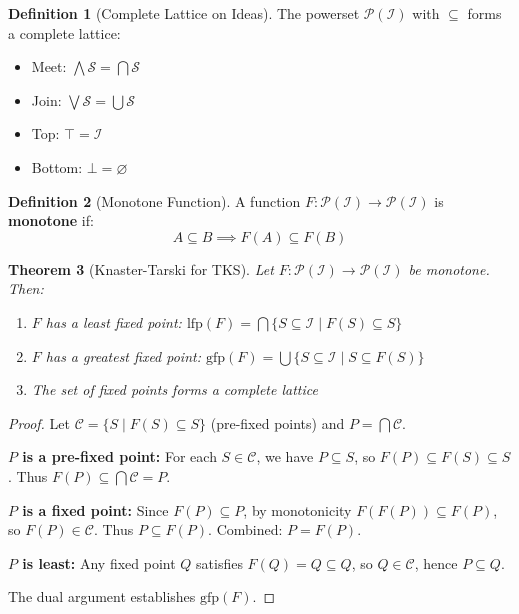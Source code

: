 \documentclass[11pt,twoside,openright]{book}
\theoremstyle{definition}
\newtheorem{definition}{Definition}[chapter]
\theoremstyle{plain}
\newtheorem{theorem}[definition]{Theorem}
\theoremstyle{remark}
\newcommand{\Ideas}{\mathcal{I}}
\begin{document}
\begin{definition}[Complete Lattice on Ideas]
\label{def:complete-lattice}
The powerset $\mathcal{P}(\Ideas)$ with $\subseteq$ forms a complete lattice:
\begin{itemize}
  \item Meet: $\bigwedge \mathcal{S} = \bigcap \mathcal{S}$
  \item Join: $\bigvee \mathcal{S} = \bigcup \mathcal{S}$
  \item Top: $\top = \Ideas$
  \item Bottom: $\bot = \varnothing$
\end{itemize}
\end{definition}

\begin{definition}[Monotone Function]
\label{def:monotone-func}
A function $F : \mathcal{P}(\Ideas) \to \mathcal{P}(\Ideas)$ is \textbf{monotone} if:
\[
A \subseteq B \implies F(A) \subseteq F(B)
\]
\end{definition}

\begin{theorem}[Knaster-Tarski for TKS]
\label{thm:knaster-tarski}
Let $F : \mathcal{P}(\Ideas) \to \mathcal{P}(\Ideas)$ be monotone. Then:
\begin{enumerate}
  \item $F$ has a least fixed point: $\mathrm{lfp}(F) = \bigcap \{S \subseteq \Ideas \mid F(S) \subseteq S\}$
  \item $F$ has a greatest fixed point: $\mathrm{gfp}(F) = \bigcup \{S \subseteq \Ideas \mid S \subseteq F(S)\}$
  \item The set of fixed points forms a complete lattice
\end{enumerate}
\end{theorem}

\begin{proof}
Let $\mathcal{C} = \{S \mid F(S) \subseteq S\}$ (pre-fixed points) and $P = \bigcap \mathcal{C}$.

\textbf{$P$ is a pre-fixed point:} For each $S \in \mathcal{C}$, we have $P \subseteq S$, so $F(P) \subseteq F(S) \subseteq S$. Thus $F(P) \subseteq \bigcap \mathcal{C} = P$.

\textbf{$P$ is a fixed point:} Since $F(P) \subseteq P$, by monotonicity $F(F(P)) \subseteq F(P)$, so $F(P) \in \mathcal{C}$. Thus $P \subseteq F(P)$. Combined: $P = F(P)$.

\textbf{$P$ is least:} Any fixed point $Q$ satisfies $F(Q) = Q \subseteq Q$, so $Q \in \mathcal{C}$, hence $P \subseteq Q$.

The dual argument establishes $\mathrm{gfp}(F)$.
\end{proof}
\end{document}
